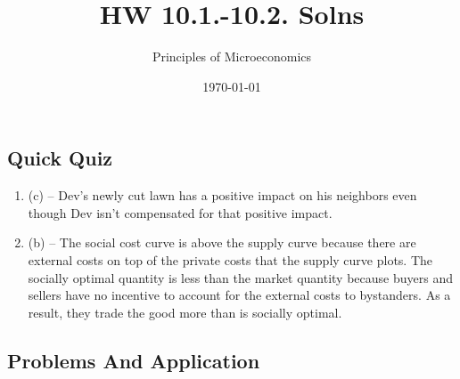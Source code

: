 \documentclass{article}
\title{HW 10.1.-10.2. Solns}
\author{Principles of Microeconomics}
\date{\today}
\begin{document}
\maketitle

\subsection*{Quick Quiz}

\begin{enumerate}

\item (c) -- Dev's newly cut lawn has a positive impact on his neighbors even though Dev isn't compensated for that positive impact. 

\item (b) -- The social cost curve is above the supply curve because there are external costs on top of the private costs that the supply curve plots. The socially optimal quantity is less than the market quantity because buyers and sellers have no incentive to account for the external costs to bystanders. As a result, they trade the good more than is socially optimal. 

\end{enumerate}

\subsection*{Problems And Application}
\end{document}
